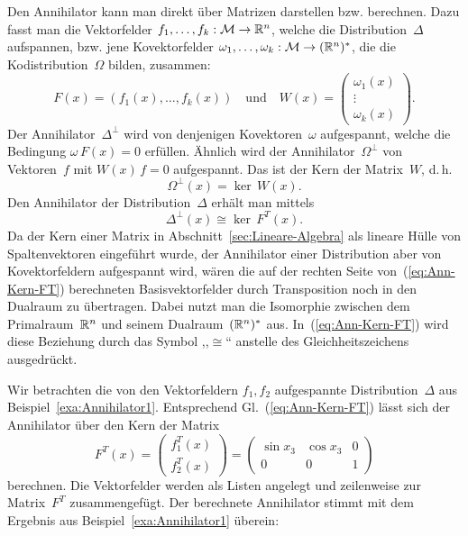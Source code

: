 Den Annihilator kann man direkt über Matrizen darstellen bzw. berechnen.
Dazu fasst man die Vektorfelder $f_{1},\ldots,f_{k}:\mathcal{M}\to{\mathbb{R}}^{n}$,
welche die Distribution~$\Delta$ aufspannen, bzw. jene Kovektorfelder
$\omega_{1},\ldots,\omega_{k}:\mathcal{M}\to({\mathbb{R}}^{n})^{*}$, die die
Kodistribution~$\Omega$ bilden, zusammen: 
\[
F(x)=\left(f_{1}(x),\ldots,f_{k}(x)\right)\quad\mbox{und}\quad W(x)=\left(\begin{array}{c}
\omega_{1}(x)\\
\vdots\\
\omega_{k}(x)
\end{array}\right).
\]
Der Annihilator~$\Delta^{\perp}$ wird von denjenigen Kovektoren~$\omega$
aufgespannt, welche die Bedingung $\omega\,F(x)=0$ erfüllen. Ähnlich
wird der Annihilator~$\Omega^{\perp}$ von Vektoren~$f$ mit $W(x)\,f=0$
aufgespannt. Das ist der Kern der Matrix~$W$, d.\,h. 
\begin{equation}
\Omega^{\perp}(x)=\ker\,W(x).\label{eq:Ann-Kern-W}
\end{equation}
Den Annihilator der Distribution~$\Delta$ erhält man mittels 
\begin{equation}
\Delta^{\perp}(x)\cong\ker\,F^{T}(x).\label{eq:Ann-Kern-FT}
\end{equation}
Da der Kern einer Matrix in Abschnitt~\ref{sec:Lineare-Algebra}
als lineare Hülle von Spaltenvektoren eingeführt wurde, der Annihilator
einer Distribution aber von Kovektorfeldern aufgespannt wird, wären
die auf der rechten Seite von~(\ref{eq:Ann-Kern-FT}) berechneten
Basisvektorfelder durch Transposition noch in den Dualraum zu übertragen.
Dabei nutzt man die Isomorphie zwischen dem Primalraum~${\mathbb{R}}^{n}$
und seinem Dualraum~$({\mathbb{R}}^{n})^{*}$ aus. In~(\ref{eq:Ann-Kern-FT})
wird diese Beziehung durch das Symbol ,,$\cong$`` anstelle des
Gleichheitszeichens ausgedrückt.

\begin{example}
\label{exa:Annihilator2}Wir betrachten die von den Vektorfeldern
$f_{1},f_{2}$ aufgespannte Distribution~$\Delta$ aus Beispiel~\ref{exa:Annihilator1}.
Entsprechend Gl.~(\ref{eq:Ann-Kern-FT}) lässt sich der Annihilator
über den Kern der Matrix
\[
F^{T}(x)=\left(\begin{array}{c}
f_{1}^{T}(x)\\
f_{2}^{T}(x)
\end{array}\right)=\left(\begin{array}{ccc}
\sin x_{3} & \cos x_{3} & 0\\
0 & 0 & 1
\end{array}\right)
\]
berechnen. Die Vektorfelder werden als Listen angelegt und zeilenweise
zur Matrix~$F^{T}$ zusammengefügt. Der berechnete Annihilator stimmt
mit dem Ergebnis aus Beispiel~\ref{exa:Annihilator1} überein:

\begin{maxima}\end{maxima}
\end{example}

